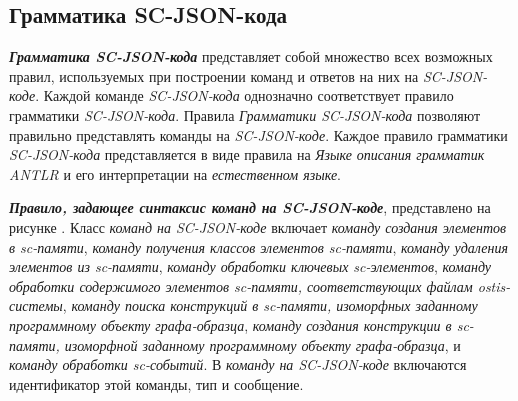 \subsection{Грамматика SC-JSON-кода}
\label{sec_soft_platform_sc_json_code_grammar}

\textbf{\textit{Грамматика SC-JSON-кода}} представляет собой множество всех возможных правил, используемых при построении команд и ответов на них на \textit{SC-JSON-коде}. Каждой команде \textit{SC-JSON-кода} однозначно соответствует правило грамматики \textit{SC-JSON-кода}. Правила \textit{Грамматики SC-JSON-кода} позволяют правильно представлять команды на \textit{SC-JSON-коде}. Каждое правило грамматики \textit{SC-JSON-кода} представляется в виде правила на \textit{Языке описания грамматик ANTLR} и его интерпретации на \textit{естественном языке}.

\begin{SCn}
\begin{scnindent}
\end{scnindent}
\begin{scnindent}
\end{scnindent}
\begin{scnindent}
\end{scnindent}
\begin{scnindent}
\end{scnindent}
\end{SCn}

\textbf{\textit{Правило, задающее синтаксис \textit{команд на SC-JSON-коде}}}, представлено на рисунке . Класс \textit{команд на SC-JSON-коде} включает \textit{команду создания элементов в sc-памяти}, \textit{команду получения классов элементов sc-памяти}, \textit{команду удаления элементов из sc-памяти}, \textit{команду обработки ключевых sc-элементов}, \textit{команду обработки содержимого элементов sc-памяти, соответствующих файлам ostis-системы}, \textit{команду поиска конструкций в sc-памяти, изоморфных заданному программному объекту графа-образца}, \textit{команду создания конструкции в sc-памяти, изоморфной заданному программному объекту графа-образца}, и \textit{команду обработки sc-событий}. В \textit{команду на SC-JSON-коде} включаются идентификатор этой команды, тип и сообщение.

